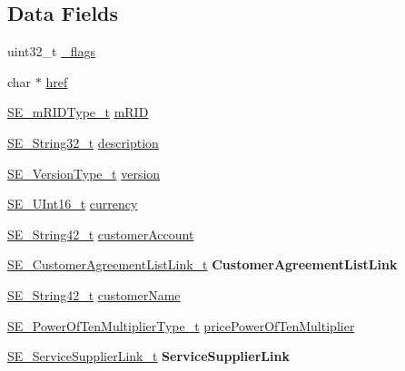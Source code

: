 \subsection*{Data Fields}
\begin{DoxyCompactItemize}
\item 
uint32\+\_\+t \hyperlink{group__CustomerAccount_ga67357b4c7d720b91d84e22a2d383b840}{\+\_\+flags}
\item 
char $\ast$ \hyperlink{group__CustomerAccount_gab1bd1ed1eeba3c50a86025c8eae89d7c}{href}
\item 
\hyperlink{group__mRIDType_gac74622112f3a388a2851b2289963ba5e}{S\+E\+\_\+m\+R\+I\+D\+Type\+\_\+t} \hyperlink{group__CustomerAccount_ga082521d42ddb1a5f0726f2581b0dd79c}{m\+R\+ID}
\item 
\hyperlink{group__String32_gac9f59b06b168b4d2e0d45ed41699af42}{S\+E\+\_\+\+String32\+\_\+t} \hyperlink{group__CustomerAccount_ga78f10a26490a0a66e2754e50f1c82d03}{description}
\item 
\hyperlink{group__VersionType_ga4b8d27838226948397ed99f67d46e2ae}{S\+E\+\_\+\+Version\+Type\+\_\+t} \hyperlink{group__CustomerAccount_ga8b1e7a90151362aeb3a332887fa74081}{version}
\item 
\hyperlink{group__UInt16_gac68d541f189538bfd30cfaa712d20d29}{S\+E\+\_\+\+U\+Int16\+\_\+t} \hyperlink{group__CustomerAccount_ga57aff523528ef264d27004ae1bff0377}{currency}
\item 
\hyperlink{group__String42_gad5a294b994fa3a024ca6d747f784f0d9}{S\+E\+\_\+\+String42\+\_\+t} \hyperlink{group__CustomerAccount_gade9da1bd7f943a99c644c927b0a25318}{customer\+Account}
\item 
\hyperlink{structSE__CustomerAgreementListLink__t}{S\+E\+\_\+\+Customer\+Agreement\+List\+Link\+\_\+t} {\bfseries Customer\+Agreement\+List\+Link}
\item 
\hyperlink{group__String42_gad5a294b994fa3a024ca6d747f784f0d9}{S\+E\+\_\+\+String42\+\_\+t} \hyperlink{group__CustomerAccount_gaa057fa102ef3d9ab9c241455867a37ae}{customer\+Name}
\item 
\hyperlink{group__PowerOfTenMultiplierType_gaf0317b781dc8dbb9cb6ac4e44a14fdef}{S\+E\+\_\+\+Power\+Of\+Ten\+Multiplier\+Type\+\_\+t} \hyperlink{group__CustomerAccount_gae70b8191d202d0a24ee6f90f8cbe9614}{price\+Power\+Of\+Ten\+Multiplier}
\item 
\hyperlink{structSE__ServiceSupplierLink__t}{S\+E\+\_\+\+Service\+Supplier\+Link\+\_\+t} {\bfseries Service\+Supplier\+Link}
\end{DoxyCompactItemize}


